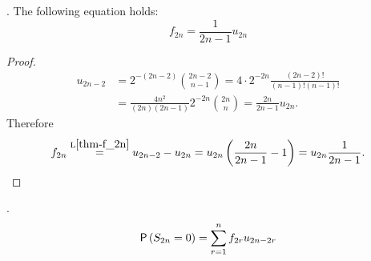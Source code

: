 \begin{lemma}\label{lemma-f_2n=frac}
  \Lrws. The following equation holds:
 \[
 f_{2n}=\frac{1}{2n-1}u_{2n}
 \]
\end{lemma}
\begin{proof}
 \[
  \begin{split}
    u_{2n-2} & =2^{-(2n-2)}\binom{2n-2}{n-1}=4\cdot 2^{-2n} \frac{ \left( 2n-2 \right) !}{ \left( n-1 \right) ! \left( n-1 \right) !}\\
    & =\frac{4n^2}{ \left( 2n \right) \left( 2n-1 \right) }2^{-2n}\binom{2n}{n}
    =\frac{2n}{2n-1}u_{2n}.
  \end{split}
 \]
 Therefore
 \[
 f_{2n} \overset{\text{L}\ref{thm-f_2n}}{=} u_{2n-2}-u_{2n}=u_{2n} \left( \frac{2n}{2n-1}-1 \right)
 =u_{2n}\frac{1}{2n-1}.
 \]
\end{proof}

\begin{lemma}[Decomposition of $f_n$]\label{lemma-decomposition_f_n}
  \Lrws.
  \[
  \pr\left(S_{2n}=0\right)=\suma[r][1][n] f_{2r}u_{2n-2r}
  \]
\end{lemma}

